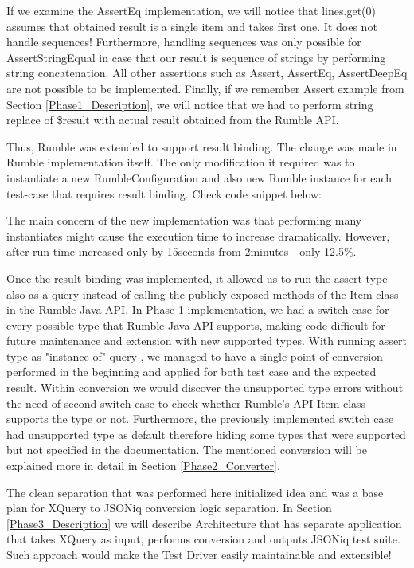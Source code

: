 If we examine the AssertEq implementation, we will notice that lines.get(0) assumes that obtained result is a single item and takes first one. It does not handle sequences! Furthermore, handling sequences was only possible for AssertStringEqual in case that our result is sequence of strings by performing string concatenation. All other assertions such as Assert, AssertEq, AssertDeepEq are not possible to be implemented. Finally, if we remember Assert example from Section \ref{Phase1_Description}, we will notice that we had to perform string replace of \$result with actual result obtained from the Rumble API. 

Thus, Rumble was extended to support result binding. The change was made in Rumble implementation itself. The only modification it required was to instantiate a new RumbleConfiguration and also new Rumble instance for each test-case that requires result binding. Check code snippet below:



The main concern of the new implementation was that performing many instantiates might cause the execution time to increase dramatically. However, after run-time increased only by 15seconds from 2minutes - only 12.5\%.

Once the result binding was implemented, it allowed us to run the assert type also as a query instead of calling the publicly exposed methods of the Item class in the Rumble Java API. In Phase 1 implementation, we had a switch case for every possible type that Rumble Java API supports, making code difficult for future maintenance and extension with new supported types. With running assert type as "instance of" query , we managed to have a single point of conversion performed in the beginning and applied for both test case and the expected result. Within conversion we would discover the unsupported type errors without the need of second switch case to check whether Rumble's API Item class supports the type or not. Furthermore, the previously implemented switch case had unsupported type as default therefore hiding some types that were supported but not specified in the documentation. The mentioned conversion will be explained more in detail in Section \ref{Phase2_Converter}. 

The clean separation that was performed here initialized idea and was a base plan for XQuery to JSONiq conversion logic separation. In Section \ref{Phase3_Description} we will describe Architecture that has separate application that takes XQuery as input, performs conversion and outputs JSONiq test suite. Such approach would make the Test Driver easily maintainable and extensible!

